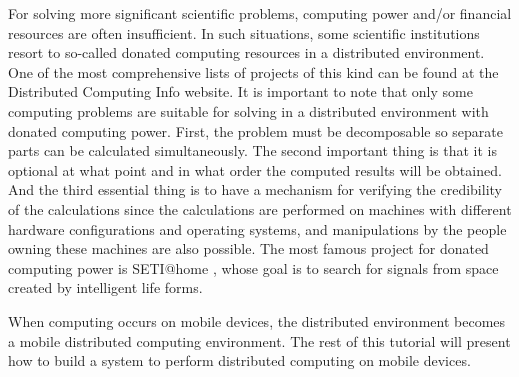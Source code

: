 For solving more significant scientific problems, computing power and/or financial resources are often insufficient. In such situations, some scientific institutions resort to so-called donated computing resources in a distributed environment. One of the most comprehensive lists of projects of this kind can be found at the Distributed Computing Info \cite{dcinfo} website. It is important to note that only some computing problems are suitable for solving in a distributed environment with donated computing power. First, the problem must be decomposable so separate parts can be calculated simultaneously. The second important thing is that it is optional at what point and in what order the computed results will be obtained. And the third essential thing is to have a mechanism for verifying the credibility of the calculations since the calculations are performed on machines with different hardware configurations and operating systems, and manipulations by the people owning these machines are also possible. The most famous project for donated computing power is SETI@home \cite{shuch}, whose goal is to search for signals from space created by intelligent life forms.

When computing occurs on mobile devices, the distributed environment becomes a mobile distributed computing environment. The rest of this tutorial will present how to build a system to perform distributed computing on mobile devices.
